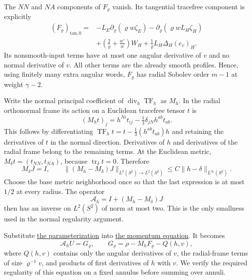 \documentclass[
  english,
  11pt,
  reqno]{amsart}
\begin{document}
The \(NN\) and \(NA\) components of \(F_\varrho\) vanish. Its tangential
tracefree component is explicitly%
 \[
\begin{aligned}
(F_\varrho)_{\mathrm{tan},0}
={}&-L_E\partial_\varrho(\varrho w\zeta_E)
 -\partial_\varrho(\varrho wL_H\zeta_H)\\
&+\left(\frac2\varrho+\frac{w'}w\right)W_H
 +\frac1\varrho L_H\Delta_H(e_v)_H.
\end{aligned}
\] Its nonsmooth-input terms have at most one angular derivative of
\(v\) and no normal derivative of \(v\). All other terms are the already
smooth profiles. Hence, using finitely many extra angular words,
\(F_\varrho\) has radial Sobolev order \(m-1\) at weight \(\gamma-2\).

Write the normal principal coefficient of
\(\operatorname{div}_h\operatorname{TF}_h\) as \(M_h\). In the radial
orthonormal frame its action on a Euclidean tracefree tensor \(t\) is%
 \[
(M_h t)_j=h^{Ni}t_{ij}
                   -\tfrac13\delta_{jN}h^{ab}t_{ab}.
\] This follows by differentiating
\(\operatorname{TF}_h t=t-\tfrac13(h^{ab}t_{ab})h\) and retaining the
derivatives of \(t\) in the normal direction. Derivatives of \(h\) and
derivatives of the radial frame belong to the remaining terms. At the
Euclidean metric, \(M_\delta t=(t_{NN},t_{NA})\), because
\(\operatorname{tr}_\delta t=0\). Therefore%
 \[
M_\delta J=I,\qquad
\|(M_h-M_\delta)J\|_{L^2(S^2)\to L^2(S^2)}
 \le C\|h-\delta\|_{L^\infty(S^2)}.
\] Choose the base metric neighborhood once so that the last expression
is at most \(1/2\) at every radius. The operator \[
\mathcal A_h=I+(M_h-M_\delta)J
\] then has an inverse on \(L^2(S^2)\) of norm at most two. This is the
only smallness used in the normal regularity argument.

Substitute \hyperref[eq:online-extension-momentum-normal-system]{the
parameterization} into
\hyperref[eq:online-momentum-variable-metric-equation]{the momentum
equation}. It becomes%
 \[
\mathcal A_hU=G_\varrho,
\qquad
G_\varrho=\rho-M_hF_\varrho-Q(h,v),
\] where \(Q(h,v)\) contains only the angular derivatives of \(v\), the
radial-frame terms of size \(\varrho^{-1}v\), and products of first
derivatives of \(h\) with \(v\). We verify the required regularity of
this equation on a fixed annulus before summing over annuli.
\end{document}
